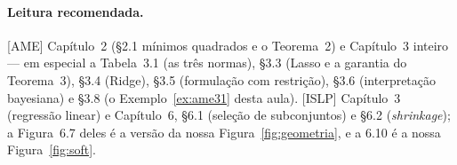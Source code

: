 \documentclass[11pt,a4paper]{article}
\begin{document}
\paragraph{Leitura recomendada.} [AME] Capítulo~2 (§2.1 mínimos quadrados e o
Teorema~2) e Capítulo~3 inteiro --- em especial a Tabela~3.1 (as três normas), §3.3
(Lasso e a garantia do Teorema~3), §3.4 (Ridge), §3.5 (formulação com restrição),
§3.6 (interpretação bayesiana) e §3.8 (o Exemplo~\ref{ex:ame31} desta aula).
[ISLP] Capítulo~3 (regressão linear) e Capítulo~6, §6.1 (seleção de subconjuntos) e
§6.2 (\emph{shrinkage}); a Figura~6.7 deles é a versão da nossa
Figura~\ref{fig:geometria}, e a 6.10 é a nossa Figura~\ref{fig:soft}.
\end{document}

